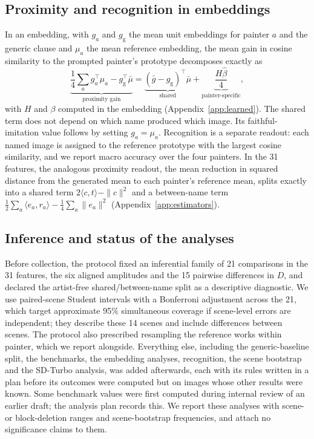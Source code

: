 \documentclass[10pt]{article}
\newcommand{\ip}[2]{\langle #1,#2\rangle}
\begin{document}
\subsection{Proximity and recognition in embeddings}

In an embedding, with $g_a$ and $g_{\mathrm{g}}$ the mean unit embeddings for painter $a$ and
the generic clause and $\mu_a$ the mean reference embedding, the mean gain in cosine
similarity to the prompted painter's prototype decomposes exactly as
\begin{equation}
\underbrace{\frac14\sum_a g_a^\top\mu_a-g_{\mathrm{g}}^\top\bar\mu}_{\text{proximity gain}}
=\underbrace{(\bar g-g_{\mathrm{g}})^\top\bar\mu}_{\text{shared}}
+\underbrace{\frac{H\widehat\beta}{4}}_{\text{painter-specific}},
\label{eq:prototype-gain}
\end{equation}
with $H$ and $\beta$ computed in the embedding (Appendix~\ref{app:learned}). The shared term
does not depend on which name produced which image. Its faithful-imitation value follows by
setting $g_a=\mu_a$. Recognition is a separate readout: each named image is assigned to the
reference prototype with the largest cosine similarity, and we report macro accuracy over the
four painters. In the 31 features, the analogous proximity readout, the mean reduction in
squared distance from the generated mean to each painter's reference mean, splits exactly into
a shared term $2\ip{c}{t}-\|c\|^2$ and a between-name term
$\frac12\sum_a\ip{e_a}{r_a}-\frac14\sum_a\|e_a\|^2$ (Appendix~\ref{app:estimators}).

\subsection{Inference and status of the analyses}\label{sec:inference}

Before collection, the protocol fixed an inferential family of 21 comparisons in the 31
features, the six aligned amplitudes and the 15 pairwise differences in $D$, and declared the
artist-free shared/between-name split as a descriptive diagnostic. We use paired-scene Student
intervals with a Bonferroni adjustment across the 21, which target approximate 95\%
simultaneous coverage if scene-level errors are independent; they describe these 14 scenes
and include differences between scenes. The protocol also prescribed resampling the reference
works within painter, which we report alongside. Everything else, including the
generic-baseline split, the benchmarks, the embedding analyses, recognition, the scene
bootstrap and the SD-Turbo analysis, was added afterwards, each with its rules written in a
plan before its outcomes were computed but on images whose other results were known. Some
benchmark values were first computed during internal review of an earlier draft; the analysis
plan records this. We report these analyses with scene- or block-deletion ranges and scene-bootstrap
frequencies, and attach no significance claims to them.
\end{document}
